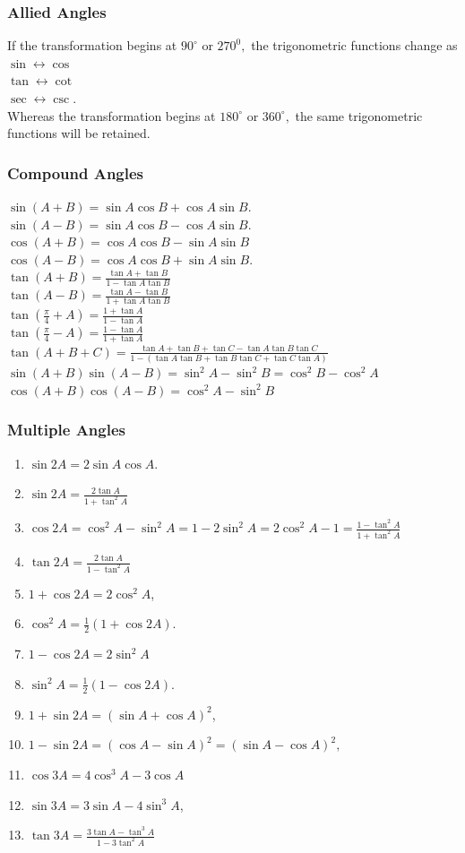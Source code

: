 \documentclass{article}
\begin{document}
\subsubsection*{Allied Angles}
If the transformation begins at $90^{\circ}$ or $270^{0},$ the trigonometric functions change as \\$\sin\leftrightarrow \cos$ \\ $\tan\leftrightarrow \cot$ \\ $\sec\leftrightarrow \csc$.
\\Whereas the transformation begins at $180^{\circ}$ or $360^{\circ},$ the same trigonometric functions will be retained.

\subsubsection*{Compound Angles}
$\sin(A+B)=\sin A\cos B+\cos A\sin B$.\\
$\sin(A-B)=\sin A\cos B-\cos A\sin B$.\\
$\cos(A+B)=\cos A\cos B-\sin A\sin B$\\
$\cos(A-B)=\cos A\cos B+\sin A\sin B.$\\
$\tan(A+B)=\frac{\tan A+\tan B}{1-\tan A\tan B}$\\
$\tan(A-B)=\frac{\tan A-\tan B}{1+\tan A\tan B}$\\
$\tan(\frac{\pi}{4}+A)=\frac{1+\tan A}{1-\tan A}$\\
$\tan(\frac{\pi}{4}-A)=\frac{1-\tan A}{1+\tan A}$\\
$\tan(A+B+C)=\frac{\tan A+\tan B+\tan C-\tan A\tan B\tan C}{1-(\tan A\tan B+\tan B\tan C+\tan C\tan A)}$\\
$\sin(A+B)\sin(A-B)=\sin^{2}A-\sin^{2}B=\cos^{2}B-\cos^{2}A$\\
$\cos(A+B)\cos(A-B)=\cos^{2}A-\sin^{2}B$

\subsubsection*{Multiple Angles}
\begin{enumerate}
\item $\sin 2A=2\sin A\cos A.$
\item $\sin 2A=\frac{2\tan A}{1+\tan^{2}A}$
\item $\cos 2A=\cos^{2}A-\sin^{2}A = 1-2\sin^{2}A = 2\cos^{2}A-1 = \frac{1-\tan^{2}A}{1+\tan^{2}A}$
\item $\tan 2A=\frac{2\tan A}{1-\tan^{2}A}$
\item $1+\cos 2A=2\cos^{2}A$,
\item $\cos^{2}A=\frac{1}{2}(1+\cos 2A).$
\item $1-\cos 2A=2\sin^{2}A$
\item $\sin^{2}A=\frac{1}{2}(1-\cos 2A).$
\item $1+\sin 2A=(\sin A+\cos A)^{2}$,
\item $1-\sin 2A=(\cos A-\sin A)^{2}=(\sin A-\cos A)^{2},$
\item $\cos 3A=4\cos^{3}A-3\cos A$
\item $\sin 3A=3\sin A-4\sin^{3}A$,
\item $\tan 3A=\frac{3\tan A-\tan^{3}A}{1-3\tan^{2}A}$
\end{enumerate}
\end{document}

